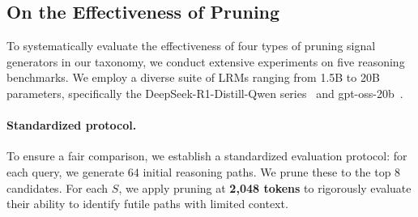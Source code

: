 \documentclass[11pt]{article}
\theoremstyle{plain}
\begin{document}
\subsection{On the Effectiveness of Pruning}
\label{subsec:On the Effectiveness of Pruning}
To systematically evaluate the effectiveness of four types of pruning signal generators in our taxonomy, we conduct extensive experiments on five reasoning benchmarks.
We employ a diverse suite of LRMs ranging from 1.5B to 20B parameters, specifically the DeepSeek-R1-Distill-Qwen series~\cite{guo2025deepseek} and gpt-oss-20b~\cite{openai2025gptoss}.

\paragraph{Standardized protocol.}
To ensure a fair comparison, we establish a standardized evaluation protocol: for each query, we generate $64$ initial reasoning paths.
We prune these to the top $8$ candidates.
For each $S$, we apply pruning at \textbf{2,048 tokens} to rigorously evaluate their ability to identify futile paths with limited context.
\end{document}
